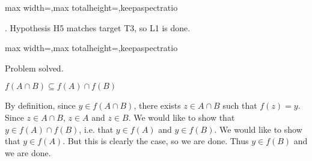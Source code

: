 \documentclass[a4paper,twoside,12pt]{article} %
\makeatletter
\DeclareRobustCommand{\_}{%
  \leavevmode\vbox{%
    \hrule\@width.4em
          \@height-.16ex
          \@depth\dimexpr.16ex+.28pt\relax}}
\newcommand\Tstrut{\rule{0pt}{2.4ex}}
\newcommand\Bstrut{\rule[-1.1ex]{0pt}{0pt}}
\newenvironment{fit}{\begin{adjustbox}{max width=\textwidth,max totalheight=\textheight,keepaspectratio}}{\end{adjustbox}}
\makeatother
\begin{document}
\begin{steps}
\begin{fit}
%
\end{fit}
\smallskip

. Hypothesis H5 matches target T3, so L1 is done.\nopagebreak[4] 
\nopagebreak[4] 
\smallskip\nopagebreak[4] 

\begin{fit}%
\end{fit}

Problem solved.
\cleardoublepage

\end{steps}
{\begin{center} \large \textbf{$f(A \cap B) \subseteq f(A) \cap f(B)$}\end{center}}\nopagebreak[4]

\begin{center}
\begin{minipage}{120mm}
By definition, since $y\in f(A\cap B)$, there exists $z\in A\cap B$ such that $f(z) = y$. Since $z\in A\cap B$, $z\in A$ and $z\in B$. We would like to show that $y\in f(A)\cap f(B)$, i.e. that $y\in f(A)$ and $y\in f(B)$. We would like to show that $y\in f(A)$. But this is clearly the case, so we are done. Thus $y\in f(B)$ and we are done.
\end{minipage}
\end{center}
\end{document}

